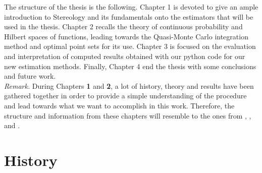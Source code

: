 The structure of the thesis is the following. Chapter 1 is devoted to give an ample introduction to Stereology and its fundamentals onto the estimators that will be used in the thesis. Chapter 2 recalls the theory of continuous probability and Hilbert spaces of functions, leading towards the Quasi-Monte Carlo integration method and optimal point sets for its use. Chapter 3 is focused on the evaluation and interpretation of computed results obtained with our python code for our new estimation methods. Finally, Chapter 4 end the thesis with some conclusions and future work.
\\[1cm]
\textit{Remark.} During Chapters \textbf{1} and \textbf{2}, a lot of history, theory and results have been gathered together in order to provide a simple understanding of the procedure and lead towards what we want to accomplish in this work. Therefore, the structure and information from these chapters will resemble to the ones from \cite{CO.IAS.17.Hist.pdf}, \cite{SterThAppl-2022-07-21.pdf}, \cite{Leobacher_Pillichshammer___2013___Introduction_to_Quasi_Montecarlo_Methods.pdf} and \cite{Hinrichs.pdf}.\\

\section{History}

